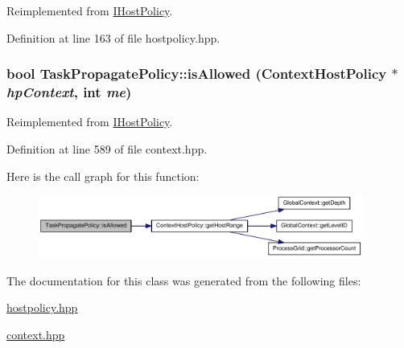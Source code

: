 Reimplemented from \hyperlink{class_i_host_policy_a5200e3143a640e492438361a3fd2626a}{IHostPolicy}.

Definition at line 163 of file hostpolicy.hpp.\hypertarget{class_task_propagate_policy_af5be0fe1cf14a044035d62b5b40c2093}{
\subsubsection[{isAllowed}]{\setlength{\rightskip}{0pt plus 5cm}bool TaskPropagatePolicy::isAllowed ({\bf ContextHostPolicy} $\ast$ {\em hpContext}, \/  int {\em me})}}
\label{class_task_propagate_policy_af5be0fe1cf14a044035d62b5b40c2093}


Reimplemented from \hyperlink{class_i_host_policy_ad7665cb96e008e8f189201662ae32736}{IHostPolicy}.

Definition at line 589 of file context.hpp.

Here is the call graph for this function:\nopagebreak
\begin{figure}[H]
\begin{center}
\leavevmode
\includegraphics[width=302pt]{class_task_propagate_policy_af5be0fe1cf14a044035d62b5b40c2093_cgraph}
\end{center}
\end{figure}


The documentation for this class was generated from the following files:\begin{DoxyCompactItemize}
\item 
\hyperlink{hostpolicy_8hpp}{hostpolicy.hpp}\item 
\hyperlink{context_8hpp}{context.hpp}\end{DoxyCompactItemize}
